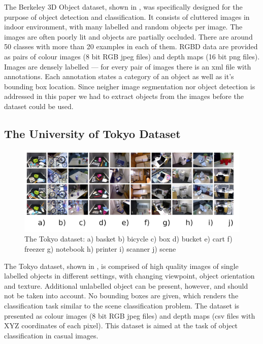 \documentclass[11pt,twoside]{article}
\begin{document}
    The Berkeley 3D Object dataset, shown in , was specifically designed for the purpose of object detection and classification. It consists of cluttered images in indoor environment, with many labelled and random objects per image. The images are often poorly lit and objects are partially occluded. There are around 50 classes with more than 20 examples in each of them. RGBD data are provided as pairs of colour images (8 bit RGB jpeg files) and depth maps (16 bit png files). Images are densely labelled --- for every pair of images there is an xml file with annotations. Each annotation states a category of an object as well as it's bounding box location. Since neigher image segmentation nor object detection is addressed in this paper we had to extract objects from the images before the dataset could be used.

  \subsection{The University of Tokyo Dataset}	
    \begin{figure}[!ht]
    \centering
    \includegraphics[width=1\textwidth]{../figs/tokyo_horizontal}
    \caption{The Tokyo dataset: a) basket b) bicycle c) box d) bucket e) cart f) freezer g) notebook h) printer i) scanner j) scene}
    \label{fig:tokyo}
    \end{figure}

    The Tokyo dataset, shown in , is comprised of high quality images of single labelled objects in different settings, with changing viewpoint, object orientation and texture. Additional unlabelled object can be present, however, and should not be taken into account. No bounding boxes are given, which renders the classification task similar to the scene classification problem. The dataset is presented as colour images (8 bit RGB jpeg files) and depth maps (csv files with XYZ coordinates of each pixel). This dataset is aimed at the task of object classification in casual images.
\end{document}
